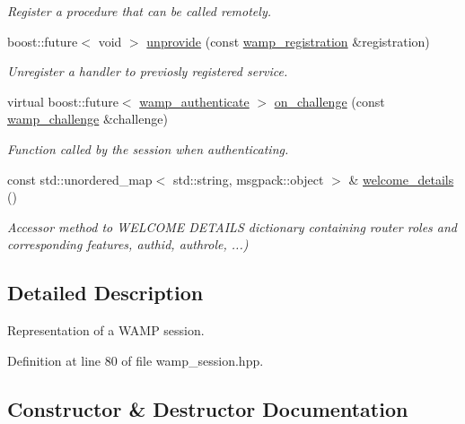 \begin{DoxyCompactItemize}
\begin{DoxyCompactList}\small\item\em Register a procedure that can be called remotely. \end{DoxyCompactList}\item 
boost\+::future$<$ void $>$ \hyperlink{classautobahn_1_1wamp__session_a029fdfb68ea7a2b31b5aaa6d7cce50d8}{unprovide} (const \hyperlink{classautobahn_1_1wamp__registration}{wamp\+\_\+registration} \&registration)
\begin{DoxyCompactList}\small\item\em Unregister a handler to previosly registered service. \end{DoxyCompactList}\item 
virtual boost\+::future$<$ \hyperlink{classautobahn_1_1wamp__authenticate}{wamp\+\_\+authenticate} $>$ \hyperlink{classautobahn_1_1wamp__session_ae48991590eed7b9d26b34c6d0a7928a0}{on\+\_\+challenge} (const \hyperlink{classautobahn_1_1wamp__challenge}{wamp\+\_\+challenge} \&challenge)
\begin{DoxyCompactList}\small\item\em Function called by the session when authenticating. \end{DoxyCompactList}\item 
const std\+::unordered\+\_\+map$<$ std\+::string, msgpack\+::object $>$ \& \hyperlink{classautobahn_1_1wamp__session_a80c666e67c8f82688cb4cf554b4b317b}{welcome\+\_\+details} ()
\begin{DoxyCompactList}\small\item\em Accessor method to W\+E\+L\+C\+O\+ME D\+E\+T\+A\+I\+LS dictionary containing router roles and corresponding features, authid, authrole, ...) \end{DoxyCompactList}\end{DoxyCompactItemize}


\subsection{Detailed Description}
Representation of a W\+A\+MP session. 

Definition at line 80 of file wamp\+\_\+session.\+hpp.



\subsection{Constructor \& Destructor Documentation}
